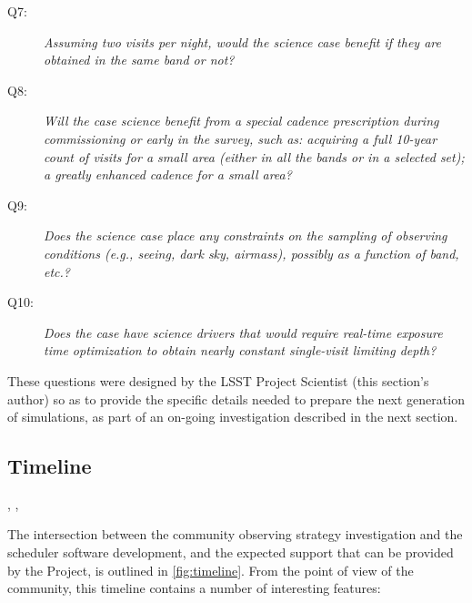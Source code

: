 \begin{description}

\item[Q7:] {\it Assuming two visits per night, would the science case
benefit if they are obtained in the same band or not?}


\item[Q8:] {\it Will the case science benefit from a special cadence
prescription during commissioning or early in the survey, such as:
acquiring a full 10-year count of visits for a small area (either in all
the bands or in a  selected set); a greatly enhanced cadence for a small
area?}


\item[Q9:] {\it Does the science case place any constraints on the
sampling of observing conditions (e.g., seeing, dark sky, airmass),
possibly as a function of band, etc.?}


\item[Q10:] {\it Does the case have science drivers that would require
real-time exposure time optimization to obtain nearly constant
single-visit limiting depth?}


\end{description}

These questions were designed by the LSST Project Scientist (this section's author) so as to provide the specific details needed to prepare the next generation of \OpSim simulations, as part of an on-going investigation described in the next section.



\subsection{Timeline}
\def\secname{intro:timeline}\label{sec:\secname}

,
,

The intersection between the community observing strategy investigation and the scheduler software development,
and the expected support that can be provided by the Project, is
outlined in \autoref{fig:timeline}. From the point of view of the community, this timeline contains a number of interesting features:

